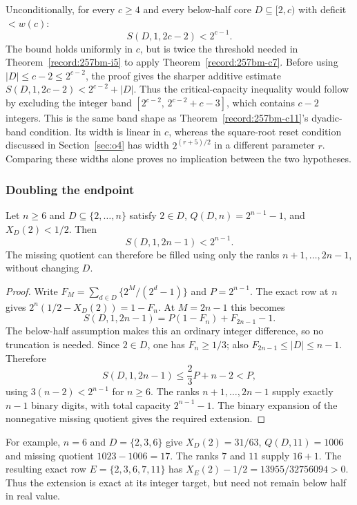 \begin{thm}\label{record:257bm-i6}
Unconditionally, for every $c\ge4$ and every below-half core $D\subseteq[2,c)$ with deficit
$<\ensuremath{w}(c)$:
\[
\ensuremath{S}(D,1,2c-2) < 2^{c-1}.
\]
The bound holds uniformly in $c$, but is twice the threshold needed
in Theorem~\ref{record:257bm-i5} to apply Theorem~\ref{record:257bm-c7}.
Before using $|D|\le c-2\le2^{c-2}$, the proof gives the sharper
additive estimate
$\ensuremath{S}(D,1,2c-2)<2^{c-2}+|D|$.
Thus the critical-capacity inequality would follow by excluding the
integer band $[2^{c-2},\,2^{c-2}+c-3]$, which contains $c-2$ integers. This is the same band
shape as Theorem~\ref{record:257bm-c11}'s dyadic-band condition.
Its width is linear in $c$, whereas the square-root reset condition
discussed in Section~\ref{sec:o4} has width $2^{(r+5)/2}$ in a
different parameter $r$.  Comparing these widths alone proves no implication
between the two hypotheses.
\end{thm}

\subsubsection*{Doubling the endpoint}

\begin{thm}\label{record:257bm-i7}
Let $n\ge6$ and $D\subseteq\{2,\ldots,n\}$ satisfy
$2\in D$, $Q(D,n)=2^{n-1}-1$, and $X_D(2)<1/2$.  Then
\[
 S(D,1,2n-1)<2^{n-1}.
\]
The missing quotient can therefore be filled using only the ranks
$n+1,\ldots,2n-1$, without changing $D$.
\end{thm}

\begin{proof}
Write $F_M=\sum_{d\in D}\{2^M/(2^d-1)\}$ and $P=2^{n-1}$.
The exact row at $n$ gives
$2^n(1/2-X_D(2))=1-F_n$.
At $M=2n-1$ this becomes
\[
 S(D,1,2n-1)=P(1-F_n)+F_{2n-1}-1.
\]
The below-half assumption makes this an ordinary integer difference,
so no truncation is needed.  Since $2\in D$, one has $F_n\ge1/3$;
also $F_{2n-1}\le|D|\le n-1$.  Therefore
\[
 S(D,1,2n-1)\le\frac23P+n-2<P,
\]
using $3(n-2)<2^{n-1}$ for $n\ge6$.
The ranks $n+1,\ldots,2n-1$ supply exactly $n-1$ binary digits,
with total capacity $2^{n-1}-1$.  The binary expansion of the
nonnegative missing quotient gives the required extension.
\end{proof}

For example, $n=6$ and $D=\{2,3,6\}$ give $X_D(2)=31/63$,
$Q(D,11)=1006$ and missing quotient $1023-1006=17$.
The ranks $7$ and $11$ supply $16+1$.
The resulting exact row $E=\{2,3,6,7,11\}$ has
$X_E(2)-1/2=13955/32756094>0$.
Thus the extension is exact at its integer target, but need not
remain below half in real value.

